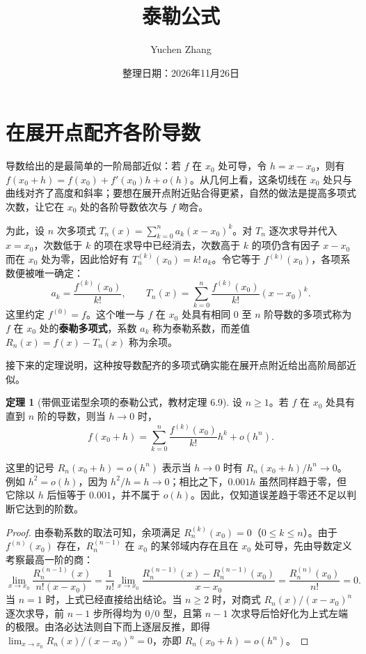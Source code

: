 \documentclass[UTF8,fontset=fandol,a4paper,12pt]{ctexart}
\title{泰勒公式}
\author{Yuchen Zhang}
\date{整理日期：2026年11月26日}
\makeatletter
\theoremstyle{definition}
\newtheorem{theorem}{定理}[section]
\renewcommand{\maketitle}{\begin{center}{\LARGE\bfseries\@title\par}\vspace{0.6em}\@author\par\vspace{0.2em}{\small\@date\par}\end{center}}
\makeatother
\begin{document}
\maketitle

\section{在展开点配齐各阶导数}
导数给出的是最简单的一阶局部近似：若 $f$ 在 $x_0$ 处可导，令 $h=x-x_0$，则有 $f(x_0+h)=f(x_0)+f'(x_0)h+o(h)$。从几何上看，这条切线在 $x_0$ 处只与曲线对齐了高度和斜率；要想在展开点附近贴合得更紧，自然的做法是提高多项式次数，让它在 $x_0$ 处的各阶导数依次与 $f$ 吻合。

为此，设 $n$ 次多项式 $T_n(x)=\sum_{k=0}^{n}a_k(x-x_0)^k$。对 $T_n$ 逐次求导并代入 $x=x_0$，次数低于 $k$ 的项在求导中已经消去，次数高于 $k$ 的项仍含有因子 $x-x_0$ 而在 $x_0$ 处为零，因此恰好有 $T_n^{(k)}(x_0)=k!\,a_k$。令它等于 $f^{(k)}(x_0)$，各项系数便被唯一确定：
\[
 a_k=\frac{f^{(k)}(x_0)}{k!},\qquad
 T_n(x)=\sum_{k=0}^{n}\frac{f^{(k)}(x_0)}{k!}(x-x_0)^k.
\]
这里约定 $f^{(0)}=f$。这个唯一与 $f$ 在 $x_0$ 处具有相同 $0$ 至 $n$ 阶导数的多项式称为 $f$ 在 $x_0$ 处的\textbf{泰勒多项式}，系数 $a_k$ 称为泰勒系数，而差值 $R_n(x)=f(x)-T_n(x)$ 称为余项。

接下来的定理说明，这种按导数配齐的多项式确实能在展开点附近给出高阶局部近似。

\begin{theorem}[带佩亚诺型余项的泰勒公式，教材定理 6.9]
设 $n\ge1$。若 $f$ 在 $x_0$ 处具有直到 $n$ 阶的导数，则当 $h\to0$ 时，
\[
 f(x_0+h)=\sum_{k=0}^{n}\frac{f^{(k)}(x_0)}{k!}h^k+o(h^n).
\]
\end{theorem}

这里的记号 $R_n(x_0+h)=o(h^n)$ 表示当 $h\to0$ 时有 $R_n(x_0+h)/h^n\to0$。例如 $h^2=o(h)$，因为 $h^2/h=h\to0$；相比之下，$0.001h$ 虽然同样趋于零，但它除以 $h$ 后恒等于 $0.001$，并不属于 $o(h)$。因此，仅知道误差趋于零还不足以判断它达到的阶数。

\begin{proof}
由泰勒系数的取法可知，余项满足 $R_n^{(k)}(x_0)=0$（$0\le k\le n$）。由于 $f^{(n)}(x_0)$ 存在，$R_n^{(n-1)}$ 在 $x_0$ 的某邻域内存在且在 $x_0$ 处可导，先由导数定义考察最高一阶的商：
\[
 \lim_{x\to x_0}\frac{R_n^{(n-1)}(x)}{n!(x-x_0)}
 =\frac{1}{n!}\lim_{x\to x_0}\frac{R_n^{(n-1)}(x)-R_n^{(n-1)}(x_0)}{x-x_0}
 =\frac{R_n^{(n)}(x_0)}{n!}=0.
\]
当 $n=1$ 时，上式已经直接给出结论。当 $n\ge2$ 时，对商式 $R_n(x)/(x-x_0)^n$ 逐次求导，前 $n-1$ 步所得均为 $0/0$ 型，且第 $n-1$ 次求导后恰好化为上式左端的极限。由洛必达法则自下而上逐层反推，即得 $\lim_{x\to x_0}R_n(x)/(x-x_0)^n=0$，亦即 $R_n(x_0+h)=o(h^n)$。
\end{proof}
\end{document}
